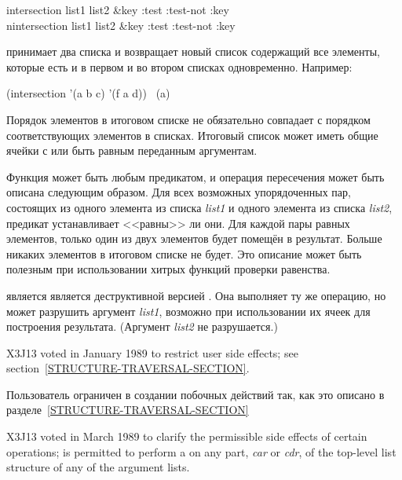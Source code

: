 \begin{defun}[Функция]
intersection list1 list2 &key :test :test-not :key \\
nintersection list1 list2 &key :test :test-not :key

 принимает два списка и возвращает новый список содержащий все
элементы, которые есть и в первом и во втором списках одновременно.
Например:
\begin{lisp}
(intersection '(a b c) '(f a d)) \EV\ (a)
\end{lisp}

Порядок элементов в итоговом списке не обязательно совпадает с порядком
соответствующих элементов в списках.
Итоговый список может иметь общие ячейки с или быть равным  переданным
аргументам.

Функция  может быть любым предикатом, и операция пересечения может
быть описана следующим образом. Для всех возможных упорядоченных пар, состоящих
из одного элемента из списка \emph{list1} и одного элемента из списка
\emph{list2}, предикат устанавливает <<равны>> ли они. Для каждой пары равных
элементов, только один из двух элементов будет помещён в результат. Больше
никаких элементов в итоговом списке не будет. Это описание может быть полезным
при использовании хитрых функций проверки равенства.

 является является деструктивной версией .
Она выполняет ту же операцию, но может разрушить аргумент \emph{list1}, возможно при
использовании их ячеек для построения результата. (Аргумент \emph{list2} не
разрушается.)

\begin{new}
X3J13 voted in January 1989
to restrict user side effects; see section~\ref{STRUCTURE-TRAVERSAL-SECTION}.
\end{new}

Пользователь ограничен в создании побочных действий так, как это описано в
разделе~\ref{STRUCTURE-TRAVERSAL-SECTION}

\begin{newer}
X3J13 voted in March 1989 
to clarify the permissible side effects of certain operations;
 is permitted to perform a  on any part,
\emph{car} or \emph{cdr}, of the top-level list structure of 
any of the argument lists.
\end{newer}
\end{defun}

